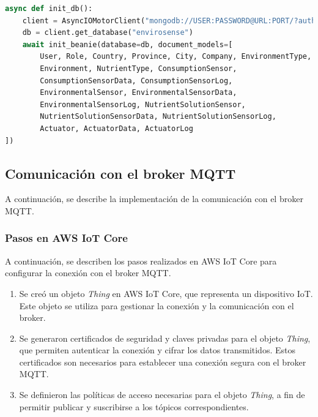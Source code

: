 \begin{lstlisting}[label=cod:mongo_connection,caption=Ejemplo de conexión a MongoDB, language=Python]
async def init_db():
    client = AsyncIOMotorClient("mongodb://USER:PASSWORD@URL:PORT/?authSource=admin")
    db = client.get_database("envirosense")
    await init_beanie(database=db, document_models=[
        User, Role, Country, Province, City, Company, EnvironmentType, 
        Environment, NutrientType, ConsumptionSensor, 
        ConsumptionSensorData, ConsumptionSensorLog, 
        EnvironmentalSensor, EnvironmentalSensorData, 
        EnvironmentalSensorLog, NutrientSolutionSensor, 
        NutrientSolutionSensorData, NutrientSolutionSensorLog, 
        Actuator, ActuatorData, ActuatorLog
])
\end{lstlisting}

\subsection{Comunicación con el broker MQTT}

A continuación, se describe la implementación de la comunicación con el broker
MQTT.


\subsubsection{Pasos en AWS IoT Core}

A continuación, se describen los pasos realizados en AWS IoT Core para
configurar la conexión con el broker MQTT.

\begin{enumerate}
    \item Se creó un objeto \textit{Thing} en AWS IoT Core, que representa un dispositivo
          IoT. Este objeto se utiliza para gestionar la conexión y la comunicación con el
          broker.
    \item Se generaron certificados de seguridad y claves privadas para el objeto
          \textit{Thing}, que permiten autenticar la conexión y cifrar los datos
          transmitidos. Estos certificados son necesarios para establecer una conexión
          segura con el broker MQTT.
    \item Se definieron las políticas de acceso necesarias para el objeto \textit{Thing},
          a fin de permitir publicar y suscribirse a los tópicos correspondientes.
\end{enumerate}

